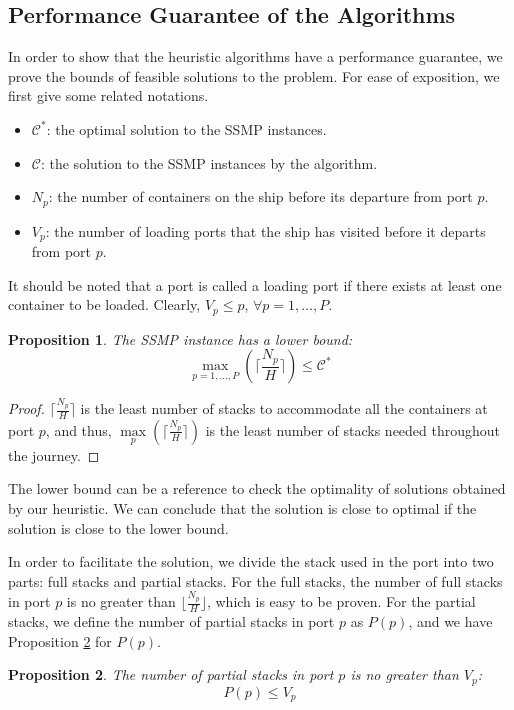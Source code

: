 \documentclass[review,3p,times,authoryear,12pt]{elsarticle}
\newtheorem{proposition}{Proposition}
\begin{document}
\subsection{Performance Guarantee of the Algorithms}
\label{sec:p3}

In order to show that the heuristic algorithms have a performance guarantee, we prove the bounds of feasible solutions to the problem.
For ease of exposition, we first give some related notations.

\begin{itemize}
\item $\mathcal{C}^*$: the optimal solution to the SSMP instances.
\item $\mathcal{C}$: the solution to the SSMP instances by the algorithm.
\item $N_p$: the number of containers on the ship before its departure from port $p$.
\item $V_p$: the number of loading ports that the ship has visited before it departs from port $p$.
\end{itemize}

It should be noted that a port is called a loading port if there exists at least one container to be loaded. Clearly, $V_p \le p$, $\forall p=1,\ldots,P$.

\begin{proposition}
The SSMP instance has a lower bound:
\begin{equation*}
\max\limits_{p=1,\ldots,P}(\lceil\frac{N_p}{H}\rceil) \le \mathcal C^*
\end{equation*}
\label{pro:a1}
\end{proposition}

\begin{proof}

$\lceil\frac{N_p}{H}\rceil$ is the least number of stacks to accommodate all the containers at port $p$, and thus, $\max\limits_p(\lceil\frac{N_p}{H}\rceil)$ is the least number of stacks needed throughout the journey.
\end{proof}

The lower bound can be a reference to check the optimality of solutions obtained by our heuristic.
We can conclude that the solution is close to optimal if the solution is close to the lower bound.

In order to facilitate the solution, we divide the stack used in the port into two parts: full stacks and partial stacks.
For the full stacks, the number of full stacks in port $p$ is no greater than $\lfloor\frac{N_p}{H}\rfloor$, which is easy to be proven.
For the partial stacks, we define the number of partial stacks in port $p$ as $P(p)$, and we have Proposition \ref{pro:a2} for $P(p)$.
\begin{proposition}
The number of partial stacks in port $p$ is no greater than $V_p$:
\begin{equation*}
 P(p) \le  V_p
\end{equation*}
\label{pro:a2}
\end{proposition}
\end{document}
